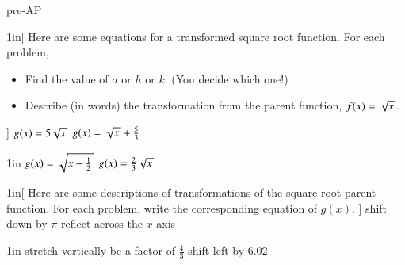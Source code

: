 \begin{taggedblock}{pre-AP}

\begin{my2Problems}[\normalsize]{1in}[%
    Here are some equations for a transformed square root function.
    For each problem,
    \vspace{-1em}
    \begin{itemize}[nosep]
        \item Find the value of $a$ or $h$ or $k$. (You decide which one!)
        \item Describe (in words) the transformation from the parent function, $f(x)=\myRoot{x}$.
    \end{itemize}
    ]
    {
        $g(x) = 5 \myRoot{x}$
    }
    {
        $g(x) = \myRoot{x} + \frac{5}{3}$
    }
\end{my2Problems}
\begin{my2Problems}[\normalsize]{1in}
    {
        $g(x) = \myRoot{x-\frac{1}{2}}$
    }
    {
        $g(x) = \frac{2}{3}\myRoot{x}$
    }
\end{my2Problems}


\newpage
\begin{my2Problems}[\normalsize]{1in}[%
    Here are some descriptions of transformations of the square root parent function.
    For each problem, write the corresponding equation of $g(x)$.
    ]
    {
        shift down by $\pi$
    }
    {
        reflect across the $x$-axis
    }
\end{my2Problems}
\begin{my2Problems}[\normalsize]{1in}
    {
        stretch vertically be a factor of $\frac{4}{3}$
    }
    {
        shift left by $6.02$
    }
\end{my2Problems}


\end{taggedblock}

